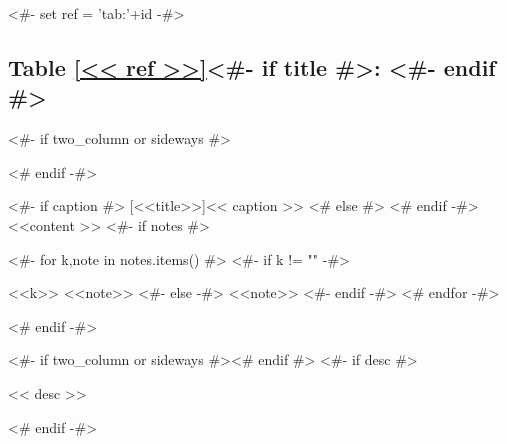 <#- set ref = 'tab:'+id -#>
\begin{samepage}
\subsection{Table \ref{<< ref >>}<#- if title #>: <#- endif #>\hfill%
  \color{light-gray}}
\nopagebreak
<#- if two_column or sideways #>
\begin{adjustbox}{width=\textwidth,center}
<# endif -#>
\begin{threeparttable}
  <#- if caption #>
  [<<title>>]{<< caption >>}
  <# else #>
  <# endif -#>\label{<< ref >>}
  <<content >>
  <#- if notes #>
  \begin{tablenotes}
    <#- for k,note in notes.items() #>
    <#- if k != "" -#>
    \item [<<k>>] <<note>>
    <#- else -#>
    <<note>>
    <#- endif -#>
    <# endfor -#>
  \end{tablenotes}
  <# endif -#>
\end{threeparttable}
<#- if two_column or sideways #>\end{adjustbox}<# endif #>
<#- if desc #>
\nopagebreak
\begin{figinfo}<< desc >>\end{figinfo}
<# endif -#>
\end{samepage}
\vspace{20pt}

